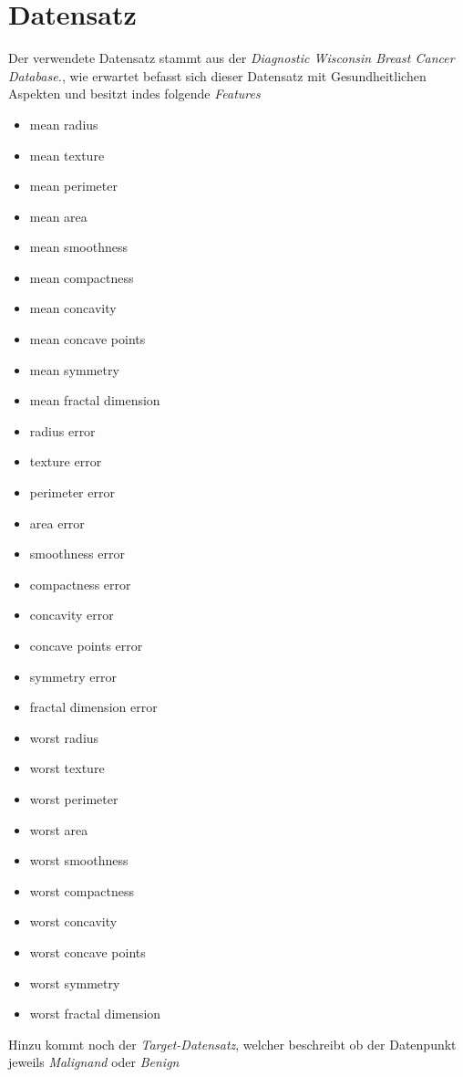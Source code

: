 \documentclass[a4paper,12pt]{article}
\begin{document}
\section{Datensatz}
Der verwendete Datensatz stammt aus der \textit{Diagnostic Wisconsin Breast Cancer Database.}\cite*{sth}, wie erwartet befasst sich dieser
Datensatz mit Gesundheitlichen Aspekten und besitzt indes folgende \textit{Features}
\begin{itemize}
    \item mean radius
    \item mean texture
    \item mean perimeter
    \item mean area
    \item mean smoothness
    \item mean compactness
    \item mean concavity
    \item mean concave points
    \item mean symmetry
    \item mean fractal dimension
    \item radius error
    \item texture error
    \item perimeter error
    \item area error
    \item smoothness error
    \item compactness error
    \item concavity error
    \item concave points error
    \item symmetry error
    \item fractal dimension error
    \item worst radius
    \item worst texture
    \item worst perimeter
    \item worst area
    \item worst smoothness
    \item worst compactness
    \item worst concavity
    \item worst concave points
    \item worst symmetry
    \item worst fractal dimension
\end{itemize}
Hinzu kommt noch der \textit{Target-Datensatz}, welcher beschreibt ob der Datenpunkt jeweils \textit{Malignand} oder \textit{Benign}
\end{document}
